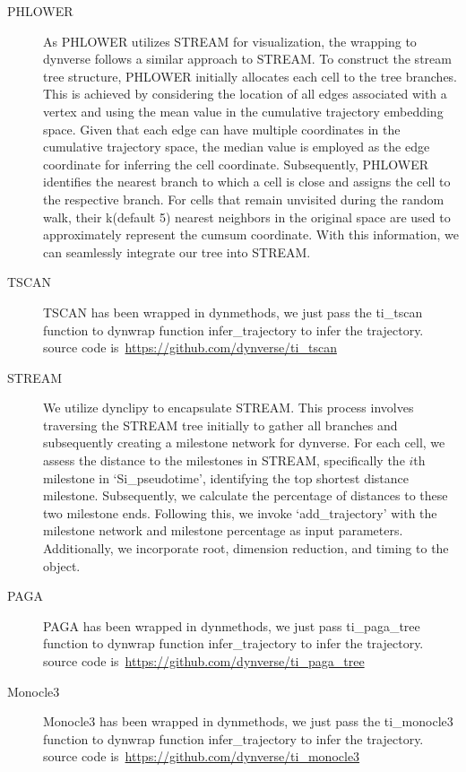 \begin{description}
	\item[PHLOWER] As PHLOWER utilizes STREAM for visualization, the wrapping to dynverse follows a similar approach to STREAM. To construct the stream tree structure, PHLOWER initially allocates each cell to the tree branches. This is achieved by considering the location of all edges associated with a vertex and using the mean value in the cumulative trajectory embedding space. Given that each edge can have multiple coordinates in the cumulative trajectory space, the median value is employed as the edge coordinate for inferring the cell coordinate. Subsequently, PHLOWER identifies the nearest branch to which a cell is close and assigns the cell to the respective branch. For cells that remain unvisited during the random walk, their k(default 5) nearest neighbors in the original space are used to approximately represent the cumsum coordinate. With this information, we can seamlessly integrate our tree into STREAM. 

	\item[TSCAN]
	TSCAN has been wrapped in dynmethods, we just pass the ti\_tscan function to dynwrap function infer\_trajectory to infer the trajectory. source code is~\url{https://github.com/dynverse/ti\_tscan}

	\item[STREAM] We utilize dynclipy to encapsulate STREAM. This process involves traversing the STREAM tree initially to gather all branches and subsequently creating a milestone network for dynverse. For each cell, we assess the distance to the milestones in STREAM, specifically the $i$th milestone in `Si\_pseudotime', identifying the top shortest distance milestone. Subsequently, we calculate the percentage of distances to these two milestone ends. Following this, we invoke `add\_trajectory' with the milestone network and milestone percentage as input parameters. Additionally, we incorporate root, dimension reduction, and timing to the object.

	\item[PAGA] 
	PAGA has been wrapped in dynmethods, we just pass ti\_paga\_tree function to dynwrap function infer\_trajectory to infer the trajectory. source code is~\url{https://github.com/dynverse/ti\_paga\_tree}

	\item[Monocle3]
	Monocle3 has been wrapped in dynmethods, we just pass the ti\_monocle3 function to dynwrap function infer\_trajectory to infer the trajectory. source code is~\url{https://github.com/dynverse/ti\_monocle3}


\end{description}

